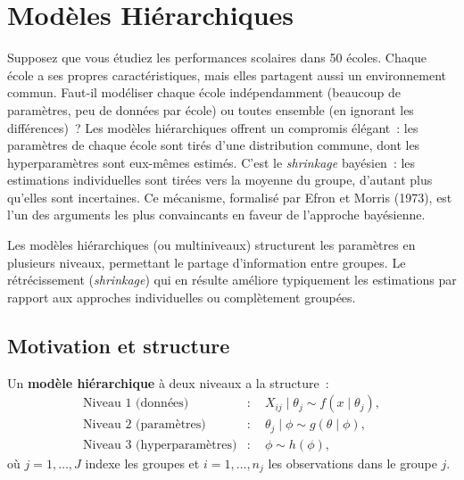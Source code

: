 \chapter{Mod\`eles Hi\'erarchiques}
\label{ch:hierarchiques}

Supposez que vous \'etudiez les performances scolaires dans 50 \'ecoles. Chaque \'ecole a ses propres caract\'eristiques, mais elles partagent aussi un environnement commun. Faut-il mod\'eliser chaque \'ecole ind\'ependamment (beaucoup de param\`etres, peu de donn\'ees par \'ecole) ou toutes ensemble (en ignorant les diff\'erences)~? Les mod\`eles hi\'erarchiques offrent un compromis \'el\'egant~: les param\`etres de chaque \'ecole sont tir\'es d'une distribution commune, dont les hyperparam\`etres sont eux-m\^emes estim\'es. C'est le \emph{shrinkage} bay\'esien~: les estimations individuelles sont \og tir\'ees \fg vers la moyenne du groupe, d'autant plus qu'elles sont incertaines. Ce m\'ecanisme, formalis\'e par Efron et Morris (1973), est l'un des arguments les plus convaincants en faveur de l'approche bay\'esienne.

\begin{intuition}[title=\textbf{Id\'ee centrale}]
Les mod\`eles hi\'erarchiques (ou multiniveaux) structurent les
param\`etres en plusieurs niveaux, permettant le partage d'information
entre groupes. Le r\'etr\'ecissement (\textit{shrinkage}) qui en
r\'esulte am\'eliore typiquement les estimations par rapport aux
approches individuelles ou compl\`etement group\'ees.
\end{intuition}

\section{Motivation et structure}

\begin{definition}
Un \textbf{mod\`ele hi\'erarchique} \`a deux niveaux a la structure~:
\begin{align*}
  \text{Niveau 1 (donn\'ees)} &: \quad X_{ij} \mid \theta_j \sim f(x \mid \theta_j), \\
  \text{Niveau 2 (param\`etres)} &: \quad \theta_j \mid \phi \sim g(\theta \mid \phi), \\
  \text{Niveau 3 (hyperparam\`etres)} &: \quad \phi \sim h(\phi),
\end{align*}
o\`u $j = 1, \ldots, J$ indexe les groupes et $i = 1, \ldots, n_j$
les observations dans le groupe $j$.
\end{definition}

